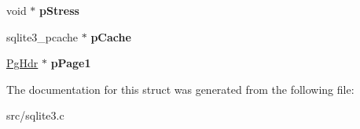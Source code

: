\begin{DoxyCompactItemize}
\item 
\hypertarget{struct_p_cache_af04a2ea8a2c6d6b3eea7bb7051b8f447}{void $\ast$ {\bfseries p\-Stress}}\label{struct_p_cache_af04a2ea8a2c6d6b3eea7bb7051b8f447}

\item 
\hypertarget{struct_p_cache_ad0248655d30d327e0eeced6c3651b161}{sqlite3\-\_\-pcache $\ast$ {\bfseries p\-Cache}}\label{struct_p_cache_ad0248655d30d327e0eeced6c3651b161}

\item 
\hypertarget{struct_p_cache_a190ece57aafde4310e424f82998776cb}{\hyperlink{struct_pg_hdr}{Pg\-Hdr} $\ast$ {\bfseries p\-Page1}}\label{struct_p_cache_a190ece57aafde4310e424f82998776cb}

\end{DoxyCompactItemize}


The documentation for this struct was generated from the following file\-:\begin{DoxyCompactItemize}
\item 
src/sqlite3.\-c\end{DoxyCompactItemize}

